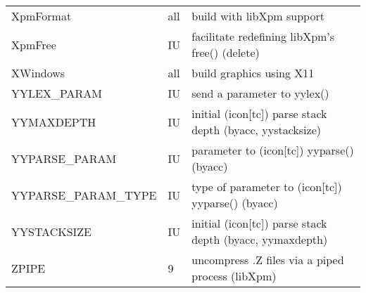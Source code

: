 \begin{xtabular}{|m{1.8in}|m{0.5in}|m{4.0in}|}
XpmFormat & all & build with libXpm support \\
XpmFree & IU & facilitate redefining libXpm's free()  (delete) \\
XWindows & all & build graphics using X11 \\
YYLEX\_PARAM & IU & send a parameter to yylex() \\
YYMAXDEPTH & IU & initial (icon[tc]) parse stack depth (byacc, yystacksize) \\
YYPARSE\_PARAM & IU & parameter to (icon[tc]) yyparse() (byacc) \\
YYPARSE\_PARAM\_TYPE & IU & type of parameter to (icon[tc]) yyparse() (byacc) \\
YYSTACKSIZE & IU & initial (icon[tc]) parse stack depth (byacc, yymaxdepth) \\
ZPIPE & 9 & uncompress .Z files via a piped process (libXpm) \\
\hline
\end{xtabular}
